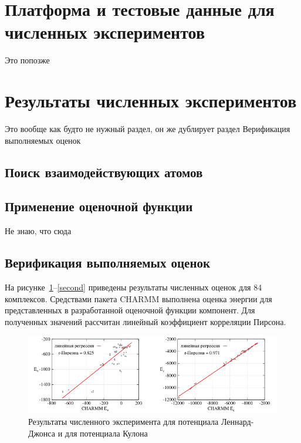 \section{Платформа и тестовые данные для численных экспериментов}


Это попозже


\section{Результаты численных экспериментов}


Это вообще как будто не нужный раздел, он же дублирует раздел Верификация выполняемых оценок


\subsection{Поиск взаимодействующих атомов}





\subsection{Применение оценочной функции}


Не знаю, что сюда


\subsection{Верификация выполняемых оценок}


На рисунке~\ref{first}--\ref{second} приведены результаты численных оценок для 84 комплексов. Средствами пакета CHARMM выполнена оценка энергии для представленных в разработанной оценочной функции компонент. Для полученных значений рассчитан линейный коэффициент корреляции Пирсона.

\begin{figure}[ht!]
	\centering
	\includegraphics[width=1.0\linewidth]{images/first.pdf}
	\caption{Результаты численного эксперимента для потенциала Леннард-Джонса и для потенциала Кулона}
	\label{first}
\end{figure}

